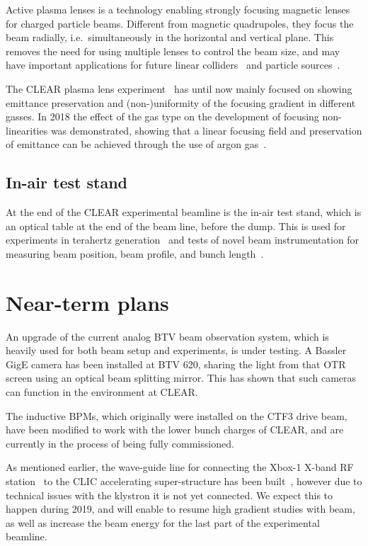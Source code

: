 \documentclass[a4paper,
               keeplastbox,   %
               ]{jacow}
\begin{document}
Active plasma lenses is a technology enabling strongly focusing magnetic lenses for charged particle beams.
Different from magnetic quadrupoles, they focus the beam radially, i.e.\ simultaneously in the horizontal and vertical plane.
This removes the need for using multiple lenses to control the beam size, and may have important applications for future linear colliders~\cite{CarlApochromatic,SteinkeCoupling} and particle sources~\cite{Braun1}.

The CLEAR plasma lens experiment~\cite{CLEAR-PLE,Erik::CLEARrev} has until now mainly focused on showing emittance preservation and (non-)uniformity of the focusing gradient in different gasses.
In 2018 the effect of the gas type on the development of focusing non-linearities was demonstrated, showing that a linear focusing field and preservation of emittance can be achieved through the use of argon gas~\cite{CarlPRL}.

\subsection{In-air test stand}

At the end of the CLEAR experimental beamline is the in-air test stand, which is an optical table at the end of the beam line, before the dump.
This is used for experiments in terahertz generation~\cite{CurcioPRAB} and tests of novel beam instrumentation for measuring beam position, beam profile, and bunch length~\cite{Thibaut::CLEARrev}.

\section{Near-term plans}

An upgrade of the current analog BTV beam observation system, which is heavily used for both beam setup and experiments, is under testing.
A Bassler GigE camera has been installed at BTV 620, sharing the light from that OTR screen using an optical beam splitting mirror.
This has shown that such cameras can function in the environment at CLEAR.

The inductive BPMs, which originally were installed on the CTF3 drive beam, have been modified to work with the lower bunch charges of CLEAR, and are currently in the process of being fully commissioned.

As mentioned earlier, the wave-guide line for connecting the Xbox-1 X-band RF station~\cite{Xbox1,Xboxen} to the CLIC accelerating super-structure has been built~\cite{Pitman:IPAC19-WEPRB063}, however due to technical issues with the klystron it is not yet connected.
We expect this to happen during 2019, and will enable to resume high gradient studies with beam, as well as increase the beam energy for the last part of the experimental beamline.
\end{document}
